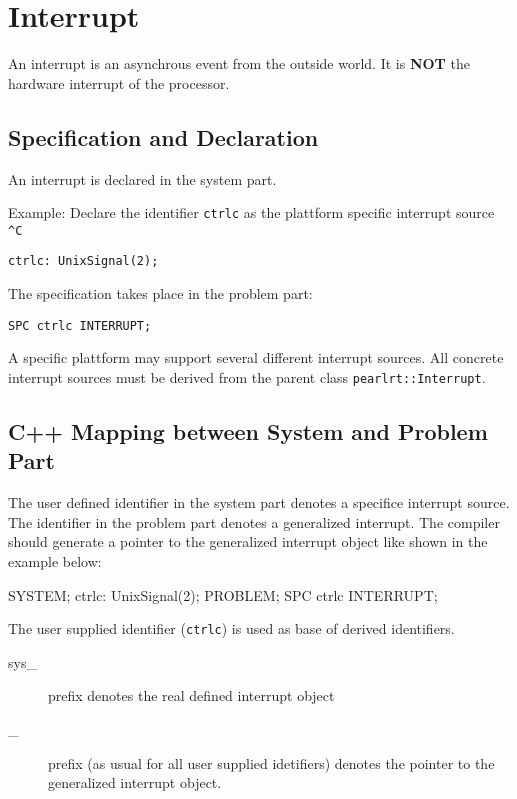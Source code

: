 \chapter{Interrupt}
An interrupt is an asynchrous event from the outside world.
It is \textbf{NOT} the hardware interrupt of the processor.

\section{Specification and Declaration}
An interrupt is declared in the system part.

Example: Declare the identifier \verb|ctrlc| as the plattform specific
interrupt source \verb|^C|

\begin{verbatim}
ctrlc: UnixSignal(2);
\end{verbatim}

The specification takes place in the problem part:

\begin{verbatim}
SPC ctrlc INTERRUPT;
\end{verbatim}

A specific plattform may support several different interrupt sources.
All concrete interrupt sources must be derived from the parent class
\verb|pearlrt::Interrupt|.


\section{C++ Mapping between System and Problem Part}
The user defined identifier in the system part denotes a specifice interrupt
source. The identifier in the problem part denotes a generalized interrupt.
The compiler should generate a pointer to the generalized interrupt object like
shown in the example below:

\begin{PEARLCode}
SYSTEM;
  ctrlc: UnixSignal(2);
PROBLEM;
   SPC ctrlc INTERRUPT;
\end{PEARLCode}

The user supplied identifier (\verb|ctrlc|) is used as base of derived
identifiers.
\begin{description}
\item[sys\_] prefix denotes the real defined interrupt object 
\item[\_] prefix (as usual for all user supplied idetifiers) denotes the
    pointer to the generalized interrupt object.
\end{description}

